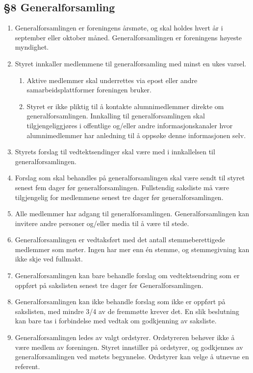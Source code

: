 \documentclass[a4paper,11pt,titlepage]{article}
\begin{document}
\subsection*{§8 Generalforsamling}
\begin{enumerate}
\item Generalforsamlingen er foreningens årsmøte, og skal holdes hvert år i september eller oktober måned. Generalforsamlingen er foreningens høyeste myndighet.

\item Styret innkaller medlemmene til generalforsamling med minst en ukes varsel. 

\begin{enumerate}
\item Aktive medlemmer skal underrettes via epost eller andre samarbeidsplattformer foreningen bruker. 
\item Styret er ikke pliktig til å kontakte alumnimedlemmer direkte om generalforsamlingen. Innkalling til generalforsamlingen skal tilgjengeliggjøres i offentlige og/eller andre informasjonskanaler hvor alumnimedlemmer har anledning til å oppsøke denne informasjonen selv. 
\end{enumerate}

\item Styrets forslag til vedtektsendinger skal være med i innkallelsen til generalforsamlingen.

\item Forslag som skal behandles på generalforsamlingen skal være sendt til styret senest fem dager før generalforsamlingen. Fullstendig saksliste må være tilgjengelig for medlemmene senest tre dager før generalforsamlingen.

\item Alle medlemmer har adgang til generalforsamlingen. Generalforsamlingen kan invitere andre personer og/eller media til å være til stede.

\item Generalforsamlingen er vedtaksført med det antall stemmeberettigede medlemmer som møter. Ingen har mer enn én stemme, og stemmegivning kan ikke skje ved fullmakt.

\item Generalforsamlingen kan bare behandle forslag om vedtektsendring som er oppført på sakslisten senest tre dager før Generalforsamlingen.

\item Generalforsamlingen kan ikke behandle forslag som ikke er oppført på sakslisten, med mindre 3/4 av de fremmøtte krever det. En slik beslutning kan bare tas i forbindelse med vedtak om godkjenning av saksliste.

\item Generalforsamlingen ledes av valgt ordstyrer. Ordstyreren behøver ikke å være medlem av foreningen. Styret innstiller på ordstyrer, og godkjennes av generalforsamlingen ved møtets begynnelse. Ordstyrer kan velge å utnevne en referent.

\end{enumerate}
\end{document}
